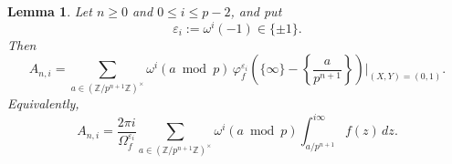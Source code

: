\documentclass[11pt,table]{amsart}
\newtheorem{lemma}[theorem]{Lemma}
\newcommand{\Z}{\mathbb{Z}}
\numberwithin{equation}{section}
\begin{document}
\begin{lemma}
\label{lem:Ani-integral-formula}
Let \(n\geq0\) and \(0\leq i\leq p-2\), and put
\[
        \varepsilon_i:=\omega^i(-1)\in\{\pm1\}.
\]
Then
\begin{equation}
\label{eq:Ani-modular-symbol-formula}
        A_{n,i}
        =
        \sum_{a\in(\Z/p^{n+1}\Z)^\times}
        \omega^i(a\bmod p)\,
        \varphi_f^{\varepsilon_i}
        \left(
        \{\infty\}
        -
        \left\{\frac{a}{p^{n+1}}\right\}
        \right)\Big|_{(X,Y)=(0,1)}.
\end{equation}
Equivalently,
\begin{equation}
\label{eq:Ani-integral-formula}
        A_{n,i}
        =
        \frac{2\pi i}{\Omega_f^{\varepsilon_i}}
        \sum_{a\in(\Z/p^{n+1}\Z)^\times}
        \omega^i(a\bmod p)
        \int_{a/p^{n+1}}^{i\infty}f(z)\,dz.
\end{equation}
\end{lemma}
\end{document}
